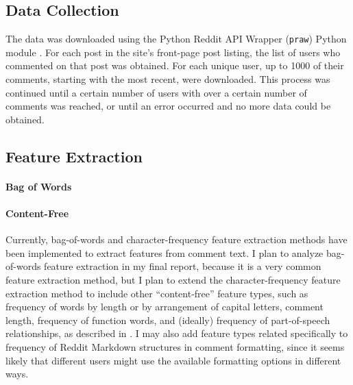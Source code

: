 \documentclass{article}
\begin{document}
\subsection{Data Collection}
The data was downloaded using the Python Reddit API Wrapper (\texttt{praw}) Python module \cite{boe2012python}. For each post in the site's front-page post listing, the list of users who commented on that post was obtained. For each unique user, up to 1000 of their comments, starting with the most recent, were downloaded. This process was continued until a certain number of users with over a certain number of comments was reached, or until an error occurred and no more data could be obtained.

\subsection{Feature Extraction}
\paragraph{Bag of Words}
\paragraph{Content-Free}
Currently, bag-of-words and character-frequency feature extraction methods have been implemented to extract features from comment text. I plan to analyze bag-of-words feature extraction in my final report, because it is a very common feature extraction method, but I plan to extend the character-frequency feature extraction method to include other ``content-free'' feature types, such as frequency of words by length or by arrangement of capital letters, comment length, frequency of function words, and (ideally) frequency of part-of-speech relationships, as described in \cite{narayanan2012feasibility}. I may also add feature types related specifically to frequency of Reddit Markdown structures in comment formatting, since it seems likely that different users might use the available formatting options in different ways.
\end{document}
